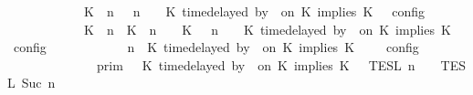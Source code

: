 \begin{isabellebody}
\ \ \ \ \ \ \ \ \ \ {\isacharequal}\ {\isasymlbrakk}\ {\isacharparenleft}{\isacharparenleft}K\ {\isasymnot}{\isasymUp}\ n{\isacharparenright}\ {\isacharhash}\ {\isasymGamma}{\isacharparenright}{\isacharcomma}\ n\ {\isasymturnstile}\ {\isasymPsi}\ {\isasymtriangleright}\ {\isacharparenleft}{\isacharparenleft}K\ time{\isacharminus}delayed\ by\ {\isasymdelta}{\isasymtau}\ on\ K\ implies\ K\ {\isacharhash}\ {\isasymPhi}{\isacharparenright}\ {\isasymrbrakk}\isactrlsub c\isactrlsub o\isactrlsub n\isactrlsub f\isactrlsub i\isactrlsub g\isanewline
\ \ \ \ \ \ \ \ \ \ {\isasymunion}\ {\isasymlbrakk}\ {\isacharparenleft}{\isacharparenleft}K\ {\isasymUp}\ n{\isacharparenright}\ {\isacharhash}\ {\isacharparenleft}K\ {\isacharat}\ n\ {\isasymoplus}\ {\isasymdelta}{\isasymtau}\ {\isasymRightarrow}\ K\ {\isacharhash}\ {\isasymGamma}{\isacharparenright}{\isacharcomma}\ n\ {\isasymturnstile}\ {\isasymPsi}\ {\isasymtriangleright}\ {\isacharparenleft}{\isacharparenleft}K\ time{\isacharminus}delayed\ by\ {\isasymdelta}{\isasymtau}\ on\ K\ implies\ K\ {\isacharhash}\ {\isasymPhi}{\isacharparenright}\ {\isasymrbrakk}\isactrlsub c\isactrlsub o\isactrlsub n\isactrlsub f\isactrlsub i\isactrlsub g{\isacartoucheclose}\isanewline
%
\isadelimproof
\ \ %
\endisadelimproof
%
\isatagproof
{}\isamarkupfalse%
\ {\isacharminus}\isanewline
\ \ \ \ \isamarkupfalse%
\ {}{\isacharcolon}{\isacartoucheopen}{\isasymlbrakk}\ {\isasymGamma}{\isacharcomma}\ n\ {\isasymturnstile}\ {\isacharparenleft}K\ time{\isacharminus}delayed\ by\ {\isasymdelta}{\isasymtau}\ on\ K\ implies\ K\ {\isacharhash}\ {\isasymPsi}\ {\isasymtriangleright}\ {\isasymPhi}\ {\isasymrbrakk}\isactrlsub c\isactrlsub o\isactrlsub n\isactrlsub f\isactrlsub i\isactrlsub g\isanewline
\ \ \ \ \ \ \ \ \ \ \ {\isacharequal}\ {\isasymlbrakk}{\isasymlbrakk}\ {\isasymGamma}\ {\isasymrbrakk}{\isasymrbrakk}\isactrlsub p\isactrlsub r\isactrlsub i\isactrlsub m\ {\isasyminter}\ {\isasymlbrakk}{\isasymlbrakk}\ {\isacharparenleft}K\ time{\isacharminus}delayed\ by\ {\isasymdelta}{\isasymtau}\ on\ K\ implies\ K\ {\isacharhash}\ {\isasymPsi}\ {\isasymrbrakk}{\isasymrbrakk}\isactrlsub T\isactrlsub E\isactrlsub S\isactrlsub L\isactrlbsup {\isasymge}\ n\isactrlesup \ {\isasyminter}\ {\isasymlbrakk}{\isasymlbrakk}\ {\isasymPhi}\ {\isasymrbrakk}{\isasymrbrakk}\isactrlsub T\isactrlsub E\isactrlsub S\isactrlsub L\isactrlbsup {\isasymge}\ Suc\ n\isactrlesup {\isacartoucheclose}\isanewline

\end{isabellebody}
